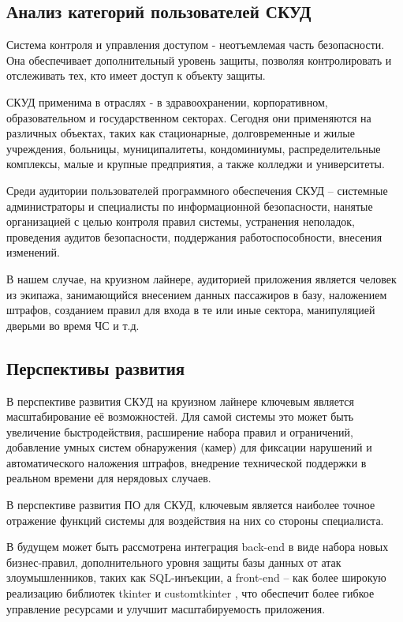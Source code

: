 \subsection{Анализ категорий пользователей СКУД}

Система контроля и управления доступом - неотъемлемая часть безопасности. Она обеспечивает дополнительный уровень защиты, позволяя контролировать и отслеживать тех, кто имеет доступ к объекту защиты.

СКУД применима в отраслях - в здравоохранении, корпоративном, образовательном и государственном секторах. Сегодня они применяются на различных объектах, таких как стационарные, долговременные и жилые учреждения, больницы, муниципалитеты, кондоминиумы, распределительные комплексы, малые и крупные предприятия, а также колледжи и университеты.

Среди аудитории пользователей программного обеспечения СКУД -- системные администраторы и специалисты по информационной безопасности, нанятые организацией с целью контроля правил системы, устранения неполадок, проведения аудитов безопасности, поддержания работоспособности, внесения изменений.

В нашем случае, на круизном лайнере, аудиторией приложения является человек из экипажа, занимающийся внесением данных пассажиров в базу, наложением штрафов, созданием правил для входа в те или иные сектора, манипуляцией дверьми во время ЧС и т.д.

\subsection{Перспективы развития}
В перспективе развития СКУД на круизном лайнере ключевым является масштабирование её возможностей. Для самой системы это может быть увеличение быстродействия, расширение набора правил и ограничений, добавление умных систем обнаружения (камер) для фиксации нарушений и автоматического наложения штрафов, внедрение технической поддержки в реальном времени для нерядовых случаев.

В перспективе развития ПО для СКУД, ключевым является наиболее точное отражение функций системы для воздействия на них со стороны специалиста.

В будущем может быть рассмотрена интеграция back-end в виде набора новых бизнес-правил, дополнительного уровня защиты базы данных от атак злоумышленников, таких как SQL-инъекции, а front-end – как более широкую реализацию библиотек \textquotedbl tkinter \textquotedbl и \textquotedbl customtkinter \textquotedbl, что обеспечит более гибкое управление ресурсами и улучшит масштабируемость приложения.

